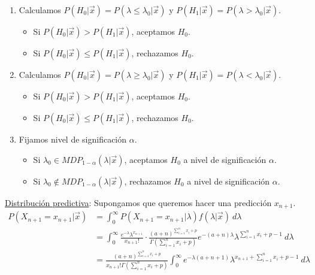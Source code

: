 \begin{enumerate}
    \item Calculamos $P(H_0 | \vec{x}) = P(\lambda \leq \lambda_0 |\vec{x})$ y $P(H_1 | \vec{x}) = P(\lambda > \lambda_0 | \vec{x})$.
          \begin{itemize}
              \item Si $P(H_0 | \vec{x}) > P(H_1 | \vec{x})$, aceptamos $H_0$.
              \item Si $P(H_0 | \vec{x}) \leq P(H_1 | \vec{x})$, rechazamos $H_0$.
          \end{itemize}
    \item Calculamos $P(H_0 | \vec{x}) = P(\lambda \ge \lambda_0 |\vec{x})$ y $P(H_1 | \vec{x}) = P(\lambda < \lambda_0 | \vec{x})$.
          \begin{itemize}
              \item Si $P(H_0 | \vec{x}) > P(H_1 | \vec{x})$, aceptamos $H_0$.
              \item Si $P(H_0 | \vec{x}) \leq P(H_1 | \vec{x})$, rechazamos $H_0$.
          \end{itemize}
    \item Fijamos nivel de significación $\alpha$.
          \begin{itemize}
              \item Si $\lambda_0 \in MDP_{1 - \alpha}(\lambda | \vec{x})$, aceptamos $H_0$ a nivel de significación $\alpha$.
              \item Si $\lambda_0 \not\in MDP_{1 - \alpha}(\lambda | \vec{x})$, rechazamos $H_0$ a nivel de significación $\alpha$.
          \end{itemize}
\end{enumerate}
\underline{Distribución predictiva}: Supongamos que queremos hacer una predicción $x_{n+1}$.
\begin{align*}
    P(X_{n+1} = x_{n+1} | \vec{x}) & = \int_{0}^{\infty} P(X_{n+1} = x_{n+1} | \lambda) f(\lambda | \vec{x}) \ d\lambda                                                                                                                               \\
                                   & = \int_{0}^{\infty} \frac{e^{-\lambda} \lambda^{x_{n+1}}}{x_{n+1}!} \cdot \frac{(a+n)^{\sum_{i=1}^{n} x_i + p}}{\Gamma(\sum_{i=1}^{n} x_i + p)} e^{-(a+n)\lambda}\lambda^{\sum_{i=1}^{n} x_i + p - 1} \ d\lambda \\
                                   & = \frac{(a+n)^{\sum_{i=1}^{n} x_i + p}}{x_{n+1}!\Gamma(\sum_{i=1}^{n} x_i + p)} \int_{0}^{\infty}  e^{-\lambda(a+n+1)}\lambda^{x_{n+1} + \sum_{i=1}^{n} x_i + p - 1} \ d\lambda
\end{align*}
